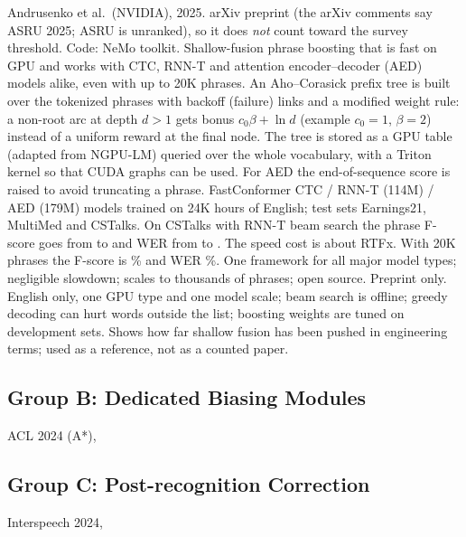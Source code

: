   {Andrusenko et al.\ (NVIDIA), 2025. arXiv preprint (the arXiv comments say ASRU 2025; ASRU is unranked), so it does \emph{not} count toward the survey threshold. Code: NeMo toolkit.}
  {Shallow-fusion phrase boosting that is fast on GPU and works with CTC, RNN-T and attention encoder--decoder (AED) models alike, even with up to 20K phrases.}
  {An Aho--Corasick prefix tree is built over the tokenized phrases with backoff (failure) links and a modified weight rule:
   a non-root arc at depth $d>1$ gets bonus $c_0\beta+\ln d$ (example $c_0{=}1$, $\beta{=}2$) instead of a uniform reward at the final node.
   The tree is stored as a GPU table (adapted from NGPU-LM) queried over the whole vocabulary,
   with a Triton kernel so that CUDA graphs can be used. For AED the end-of-sequence score is raised to avoid truncating a phrase.}
  {FastConformer CTC / RNN-T (114M) / AED (179M) models trained on 24K hours of English; test sets Earnings21, MultiMed and CSTalks.
   On CSTalks with RNN-T beam search the phrase F-score goes from  to  and WER from  to .
   The speed cost is about  RTFx. With 20K phrases the F-score is \% and WER \%.}
  {One framework for all major model types; negligible slowdown; scales to thousands of phrases; open source.}
  {Preprint only. English only, one GPU type and one model scale; beam search is offline;
   greedy decoding can hurt words outside the list; boosting weights are tuned on development sets.}
  {Shows how far shallow fusion has been pushed in engineering terms; used as a reference, not as a counted paper.}

\subsection{Group B: Dedicated Biasing Modules}
  {\todo{}}{\todo{}}{\todo{}}{\todo{}}{\todo{}}{\todo{}}{\todo{}}
  {ACL 2024 (A*), \todo{}}{\todo{}}{\todo{}}{\todo{}}{\todo{}}{\todo{}}{}

\subsection{Group C: Post-recognition Correction}
  {Interspeech 2024, \todo{}}{\todo{}}{\todo{}}{\todo{}}{\todo{}}{\todo{}}{}

